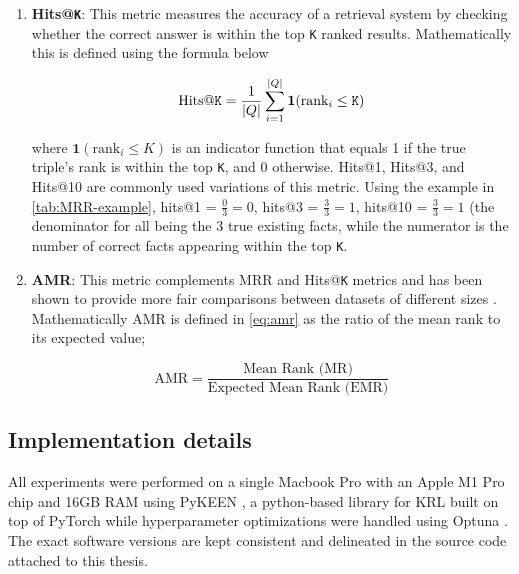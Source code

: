 \begin{enumerate}
\item 
\textbf{Hits@\texttt{K}}: This metric measures the accuracy of a retrieval system by checking whether the correct answer is within the top \texttt{K} ranked results. Mathematically this is defined using the formula below

\begin{equation}
    \text{Hits@\texttt{K}} = \frac{1}{|Q|} \sum_{i=1}^{|Q|} \mathbf{1}(\text{rank}_i \leq \texttt{K})
\end{equation}

where \(\mathbf{1}(\text{rank}_i \leq K)\) is an indicator function that equals 1 if the true triple's rank is within the top \texttt{K}, and 0 otherwise. Hits@1, Hits@3, and Hits@10 are commonly used variations of this metric. Using the example in \autoref{tab:MRR-example}, hits@1 = $\frac{0}{3} = 0$, hits@3 = $\frac{3}{3} = 1$, hits@10 = $\frac{3}{3} = 1$ (the denominator for all being the 3 true existing facts, while the numerator is the number of correct facts appearing within the top \texttt{K}.  

\item 
\textbf{\ac{AMR}}: This metric complements \ac{MRR} and Hits@\texttt{K} metrics and has been shown to provide more fair comparisons between datasets of different sizes \citep{Berrendorf2020OnMethods}. Mathematically \ac{AMR} is defined in \autoref{eq:amr} as the ratio of the mean rank to its expected value;

\begin{equation}
\label{eq:amr}
\text{AMR} = \frac{\text{Mean Rank (MR)}}{\text{Expected Mean Rank (EMR)}}
\end{equation}

\end{enumerate}

\subsection{Implementation details}
All experiments were performed on a single Macbook Pro with an  Apple M1 Pro chip and 16GB RAM using PyKEEN \citep{Ali2020PyKEENEmbeddings}, a python-based library for \ac{KRL} built on top of PyTorch while hyperparameter optimizations were handled using Optuna \citep{Akiba2019Optuna:Framework}. The exact software versions are kept consistent and delineated in the source code attached to this thesis.